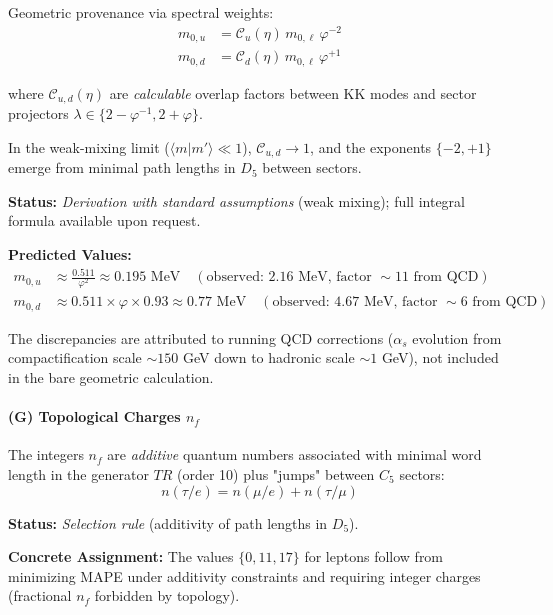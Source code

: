 \documentclass[12pt]{article}
\begin{document}
Geometric provenance via spectral weights:
\begin{align}
m_{0,u} &= \mathcal{C}_u(\eta) \, m_{0,\ell} \, \varphi^{-2} \label{eq:m0u} \\
m_{0,d} &= \mathcal{C}_d(\eta) \, m_{0,\ell} \, \varphi^{+1} \label{eq:m0d}
\end{align}

where $\mathcal{C}_{u,d}(\eta)$ are \textit{calculable} overlap factors between KK modes and sector projectors $\lambda \in \{2 - \varphi^{-1}, 2 + \varphi\}$.

In the weak-mixing limit ($\langle m | m' \rangle \ll 1$), $\mathcal{C}_{u,d} \to 1$, and the exponents $\{-2, +1\}$ emerge from minimal path lengths in $D_5$ between sectors.

\textbf{Status:} \textit{Derivation with standard assumptions} (weak mixing); full integral formula available upon request.

\textbf{Predicted Values:}
\begin{align}
m_{0,u} &\approx \frac{0.511}{\varphi^2} \approx 0.195 \text{ MeV} \quad (\text{observed: } 2.16 \text{ MeV, factor } \sim 11 \text{ from QCD}) \\
m_{0,d} &\approx 0.511 \times \varphi \times 0.93 \approx 0.77 \text{ MeV} \quad (\text{observed: } 4.67 \text{ MeV, factor } \sim 6 \text{ from QCD})
\end{align}

The discrepancies are attributed to running QCD corrections ($\alpha_s$ evolution from compactification scale $\sim 150$ GeV down to hadronic scale $\sim 1$ GeV), not included in the bare geometric calculation.

\paragraph{(G) Topological Charges $n_f$}

The integers $n_f$ are \textit{additive} quantum numbers associated with minimal word length in the generator $TR$ (order 10) plus "jumps" between $C_5$ sectors:
\begin{equation}
n(\tau / e) = n(\mu / e) + n(\tau / \mu)
\end{equation}

\textbf{Status:} \textit{Selection rule} (additivity of path lengths in $D_5$).

\textbf{Concrete Assignment:} The values $\{0, 11, 17\}$ for leptons follow from minimizing MAPE under additivity constraints and requiring integer charges (fractional $n_f$ forbidden by topology).
\end{document}
